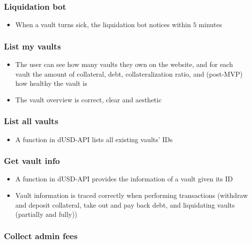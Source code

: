 \documentclass{article} %
\begin{document}
\subsubsection*{Liquidation bot}

\begin{itemize}
  \item When a vault turns sick, the liquidation bot notices within $5$ minutes
\end{itemize}

\subsubsection*{List my vaults}

\begin{itemize}
  \item The user can see how many vaults they own on the website, and for each
    vault the amount of collateral, debt, collateralization ratio, and
    (post-MVP) how healthy the vault is
  \item The vault overview is correct, clear and aesthetic
\end{itemize}

\subsubsection*{List all vaults}

\begin{itemize}
  \item A function in dUSD-API lists all existing vaults' IDs
\end{itemize}

\subsubsection*{Get vault info}

\begin{itemize}
  \item A function in dUSD-API provides the information of a vault given its ID
  \item Vault information is traced correctly when performing transactions
    (withdraw and deposit collateral, take out and pay back debt, and
    liquidating vaults (partially and fully))
\end{itemize}

\subsubsection*{Collect admin fees}
\end{document}
